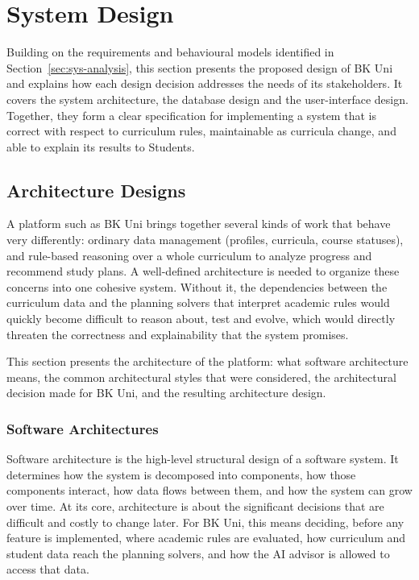 \section{System Design}
\label{sec:sys-design}

Building on the requirements and behavioural models identified in Section~\ref{sec:sys-analysis}, this section presents the proposed design of BK Uni and explains how each design decision addresses the needs of its stakeholders. It covers the system architecture, the database design and the user-interface design. Together, they form a clear specification for implementing a system that is correct with respect to curriculum rules, maintainable as curricula change, and able to explain its results to Students.

\subsection{Architecture Designs}
\label{subsec:architecture-design}

A platform such as BK Uni brings together several kinds of work that behave very differently: ordinary data management (profiles, curricula, course statuses), and rule-based reasoning over a whole curriculum to analyze progress and recommend study plans. A well-defined architecture is needed to organize these concerns into one cohesive system. Without it, the dependencies between the curriculum data and the planning solvers that interpret academic rules would quickly become difficult to reason about, test and evolve, which would directly threaten the correctness and explainability that the system promises.

This section presents the architecture of the platform: what software architecture means, the common architectural styles that were considered, the architectural decision made for BK Uni, and the resulting architecture design.

\subsubsection{Software Architectures}
\label{subsubsec:software-architecture}

Software architecture is the high-level structural design of a software system. It determines how the system is decomposed into components, how those components interact, how data flows between them, and how the system can grow over time. At its core, architecture is about the significant decisions that are difficult and costly to change later. For BK Uni, this means deciding, before any feature is implemented, where academic rules are evaluated, how curriculum and student data reach the planning solvers, and how the AI advisor is allowed to access that data.

